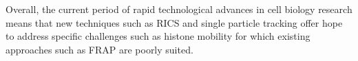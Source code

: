     Overall, the current period of rapid technological advances in
    cell biology research means that new techniques such as RICS and
    single particle tracking offer
    hope to address specific challenges such as histone mobility for
    which existing approaches such as FRAP are poorly suited.


